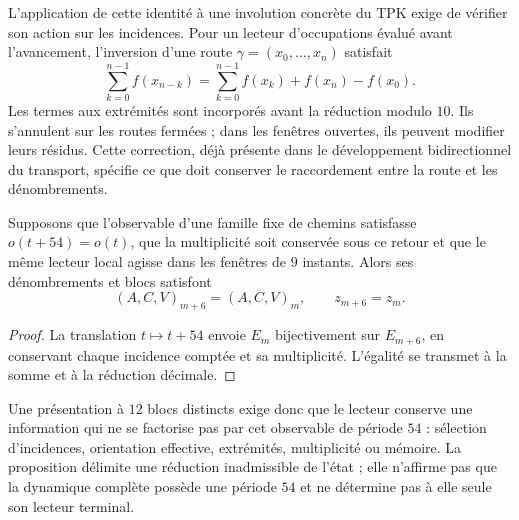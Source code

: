 L'application de cette identité à une involution concrète du TPK exige
de vérifier son action sur les incidences. Pour un lecteur d'occupations
évalué avant l'avancement, l'inversion d'une route
\(\gamma=(x_0,\ldots,x_n)\) satisfait
\[
 \sum_{k=0}^{n-1}f(x_{n-k})
 =\sum_{k=0}^{n-1}f(x_k)+f(x_n)-f(x_0).
\]
Les termes aux extrémités sont incorporés avant la réduction modulo
\(10\). Ils s'annulent sur les routes fermées ; dans les fenêtres ouvertes, ils peuvent
modifier leurs résidus. Cette correction, déjà présente dans le développement
bidirectionnel du transport, spécifie ce que doit conserver le raccordement
entre la route et les dénombrements.

\begin{proposition}
Supposons que l’observable d’une famille fixe de chemins satisfasse
\(o(t+54)=o(t)\), que la multiplicité soit conservée sous ce retour
et que le même lecteur local agisse dans les fenêtres de \(9\) instants.
Alors ses dénombrements et blocs satisfont
\[
 (A,C,V)_{m+6}=(A,C,V)_m,\qquad z_{m+6}=z_m.
\]
\end{proposition}

\begin{proof}
La translation \(t\mapsto t+54\) envoie \(E_m\) bijectivement
sur \(E_{m+6}\), en conservant chaque incidence comptée et sa multiplicité.
L'égalité se transmet à la somme et à la réduction décimale.
\end{proof}

Une présentation à \(12\) blocs distincts exige donc que
le lecteur conserve une information qui ne se factorise pas par cet observable
de période \(54\) : sélection d'incidences, orientation effective,
extrémités, multiplicité ou mémoire. La proposition délimite une réduction
inadmissible de l'état ; elle n'affirme pas que la dynamique complète possède une
période \(54\) et ne détermine pas à elle seule son lecteur terminal.
